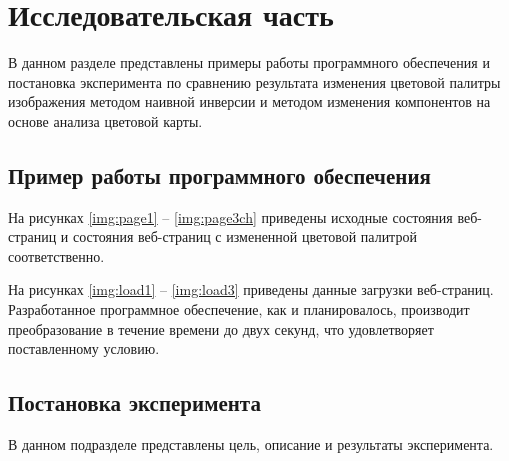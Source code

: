 \chapter{Исследовательская часть}

В данном разделе представлены примеры работы программного обеспечения и постановка эксперимента по сравнению результата изменения цветовой палитры изображения методом наивной инверсии и методом изменения компонентов на основе анализа цветовой карты.

\section{Пример работы программного обеспечения}

На рисунках \ref{img:page1} -- \ref{img:page3ch} приведены исходные состояния веб-страниц и состояния веб-страниц с измененной цветовой палитрой соответственно.

\clearpage







На рисунках \ref{img:load1} -- \ref{img:load3} приведены данные загрузки веб-страниц. Разработанное программное обеспечение, как и планировалось, производит преобразование в течение времени до двух секунд, что удовлетворяет поставленному условию.




\section{Постановка эксперимента}

В данном подразделе представлены цель, описание и результаты эксперимента.

